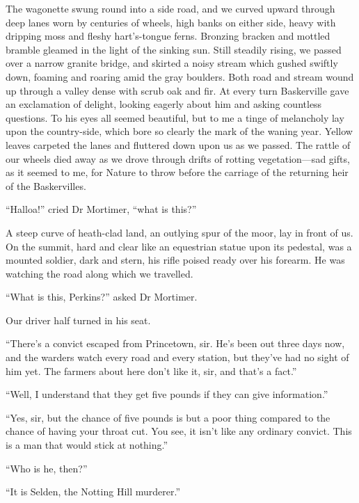 \documentclass[paper=a5,BCOR=7mm,twoside,DIV=calc,12pt,usegeometry,openany,chapterprefix,endperiod,headings=big]{scrbook} %
\begin{document}
The wagonette swung round into a side road, and we curved upward through deep lanes worn by centuries of wheels, high banks on either side, heavy with dripping moss and fleshy hart's-tongue ferns. Bronzing bracken and mottled bramble gleamed in the light of the sinking sun. Still steadily rising, we passed over a narrow granite bridge, and skirted a noisy stream which gushed swiftly down, foaming and roaring amid the gray boulders. Both road and stream wound up through a valley dense with scrub oak and fir. At every turn Baskerville gave an exclamation of delight, looking eagerly about him and asking countless questions. To his eyes all seemed beautiful, but to me a tinge of melancholy lay upon the country-side, which bore so clearly the mark of the waning year. Yellow leaves carpeted the lanes and fluttered down upon us as we passed. The rattle of our wheels died away as we drove through drifts of rotting vegetation---sad gifts, as it seemed to me, for Nature to throw before the carriage of the returning heir of the Baskervilles.

\enquote{Halloa!} cried Dr Mortimer, \enquote{what is this?}

A steep curve of heath-clad land, an outlying spur of the moor, lay in front of us. On the summit, hard and clear like an equestrian statue upon its pedestal, was a mounted soldier, dark and stern, his rifle poised ready over his forearm. He was watching the road along which we travelled.

\enquote{What is this, Perkins?} asked Dr Mortimer.

Our driver half turned in his seat.

\enquote{There's a convict escaped from Princetown, sir. He's been out three days now, and the warders watch every road and every station, but they've had no sight of him yet. The farmers about here don't like it, sir, and that's a fact.}

\enquote{Well, I understand that they get five pounds if they can give information.}

\enquote{Yes, sir, but the chance of five pounds is but a poor thing compared to the chance of having your throat cut. You see, it isn't like any ordinary convict. This is a man that would stick at nothing.}

\enquote{Who is he, then?}

\enquote{It is Selden, the Notting Hill murderer.}
\end{document}
